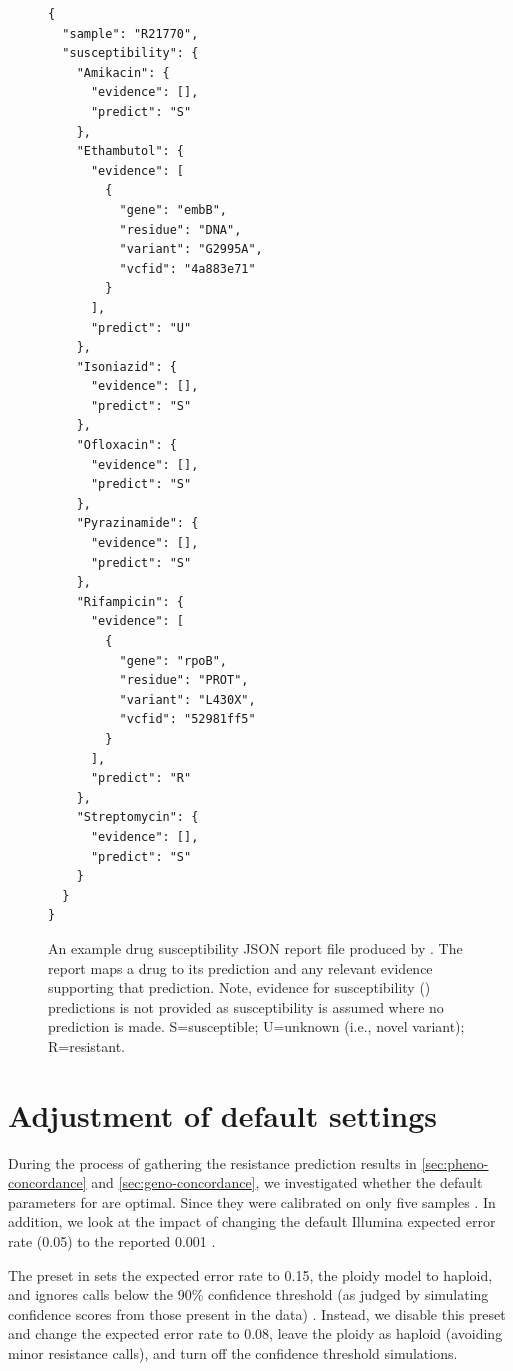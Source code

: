 \begin{figure}
\begin{verbatim}
{
  "sample": "R21770",
  "susceptibility": {
    "Amikacin": {
      "evidence": [],
      "predict": "S"
    },
    "Ethambutol": {
      "evidence": [
        {
          "gene": "embB",
          "residue": "DNA",
          "variant": "G2995A",
          "vcfid": "4a883e71"
        }
      ],
      "predict": "U"
    },
    "Isoniazid": {
      "evidence": [],
      "predict": "S"
    },
    "Ofloxacin": {
      "evidence": [],
      "predict": "S"
    },
    "Pyrazinamide": {
      "evidence": [],
      "predict": "S"
    },
    "Rifampicin": {
      "evidence": [
        {
          "gene": "rpoB",
          "residue": "PROT",
          "variant": "L430X",
          "vcfid": "52981ff5"
        }
      ],
      "predict": "R"
    },
    "Streptomycin": {
      "evidence": [],
      "predict": "S"
    }
  }
}
\end{verbatim}
\caption{An example drug susceptibility JSON report file produced by \drprg{}. The report maps a drug to its prediction and any relevant evidence supporting that prediction. Note, evidence for susceptibility () predictions is not provided as susceptibility is assumed where no  prediction is made. S=susceptible; U=unknown (i.e., novel variant); R=resistant.}
\label{fig:example-drprg-report}
\end{figure}

\section{Adjustment of default \mykrobe{} \ont{} settings}
\label{app:mykrobe-settings}

During the process of gathering the resistance prediction results in \autoref{sec:pheno-concordance} and \autoref{sec:geno-concordance}, we investigated whether the \mykrobe{} default parameters for \ont{} are optimal. Since they were calibrated on only five samples \cite{hunt2019}. In addition, we look at the impact of changing the default Illumina expected error rate (0.05) to the reported 0.001 \cite{manley2016}.

The \ont{} preset in \mykrobe{} sets the expected error rate to 0.15, the ploidy model to haploid, and ignores calls below the 90\% confidence threshold (as judged by simulating confidence scores from those present in the data) \cite{hunt2019}. Instead, we disable this preset and change the expected error rate to 0.08, leave the ploidy as haploid (avoiding minor resistance calls), and turn off the confidence threshold simulations.

